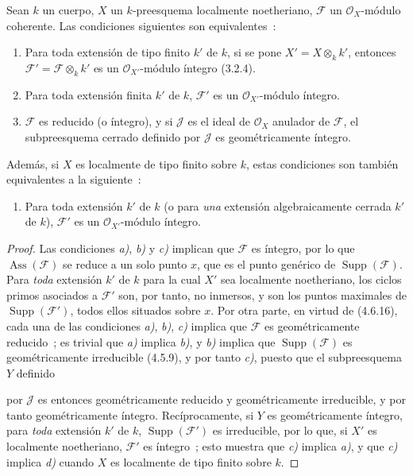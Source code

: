 \begin{proposition}[4.6.18]
\label{IV.2.4.6.18-fr}
Sean $k$ un cuerpo, $X$ un $k$-preesquema localmente noetheriano, $\mathscr F$
un $\mathcal O_X$-módulo coherente. Las condiciones siguientes son
equivalentes~:
\begin{enumerate}
\item[\textup{a)}] Para toda extensión de tipo finito $k'$ de $k$, si se pone
$X'=X\otimes_k k'$, entonces $\mathscr F'=\mathscr F\otimes_k k'$ es un
$\mathcal O_{X'}$-módulo íntegro \textup{(3.2.4)}.
\item[\textup{b)}] Para toda extensión finita $k'$ de $k$, $\mathscr F'$ es un
$\mathcal O_{X'}$-módulo íntegro.
\item[\textup{c)}] $\mathscr F$ es reducido (o íntegro), y si $\mathscr J$ es el ideal
de $\mathcal O_X$ anulador de $\mathscr F$, el subpreesquema cerrado definido
por $\mathscr J$ es geométricamente íntegro.
\end{enumerate}
Además, si $X$ es localmente de tipo finito sobre $k$, estas condiciones son
también equivalentes a la siguiente~:
\begin{enumerate}
\item[\textup{d)}] Para toda extensión $k'$ de $k$ \textup{(o} para \emph{una} extensión
algebraicamente cerrada $k'$ de $k$), $\mathscr F'$ es un
$\mathcal O_{X'}$-módulo íntegro.
\end{enumerate}
\end{proposition}

\begin{proof}
Las condiciones \emph{a)}, \emph{b)} y \emph{c)} implican que $\mathscr F$ es íntegro, por lo que
$\operatorname{Ass}(\mathscr F)$ se reduce a un solo punto $x$, que es el punto
genérico de $\operatorname{Supp}(\mathscr F)$. Para \emph{toda} extensión $k'$ de $k$
para la cual $X'$ sea localmente noetheriano, los ciclos primos asociados a
$\mathscr F'$ son, por tanto, no inmersos, y son los puntos maximales de
$\operatorname{Supp}(\mathscr F')$, todos ellos situados sobre $x$. Por otra
parte, en virtud de (4.6.16), cada una de las condiciones \emph{a)}, \emph{b)}, \emph{c)} implica que
$\mathscr F$ es geométricamente reducido~; es trivial que \emph{a)} implica \emph{b)}, y \emph{b)}
implica que $\operatorname{Supp}(\mathscr F)$ es geométricamente irreducible
(4.5.9), y por tanto \emph{c)}, puesto que el subpreesquema $Y$ definido


por $\mathscr J$ es entonces geométricamente reducido y geométricamente
irreducible, y por tanto geométricamente íntegro. Recíprocamente, si $Y$ es
geométricamente íntegro, para \emph{toda} extensión $k'$ de $k$,
$\operatorname{Supp}(\mathscr F')$ es irreducible, por lo que, si $X'$ es
localmente noetheriano, $\mathscr F'$ es íntegro~; esto muestra que \emph{c)} implica
\emph{a)}, y que \emph{c)} implica \emph{d)} cuando $X$ es localmente de tipo finito sobre $k$.
\end{proof}
